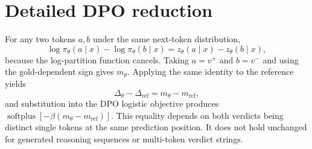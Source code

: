 \section{Detailed DPO reduction}

For any two tokens $a,b$ under the same next-token distribution,
\begin{equation}
\log\pi_\theta(a\mid x)-\log\pi_\theta(b\mid x)
=z_\theta(a\mid x)-z_\theta(b\mid x),
\end{equation}
because the log-partition function cancels. Taking $a=v^+$ and $b=v^-$ and
using the gold-dependent sign gives $m_\theta$. Applying the same identity to the
reference yields
\begin{equation}
\Delta_\theta-\Delta_{\mathrm{ref}}=m_\theta-m_{\mathrm{ref}},
\end{equation}
and substitution into the DPO logistic objective produces
$\operatorname{softplus}[-\beta(m_\theta-m_{\mathrm{ref}})]$. This equality
depends on both verdicts being distinct single tokens at the same prediction
position. It does not hold unchanged for generated reasoning sequences or
multi-token verdict strings.

